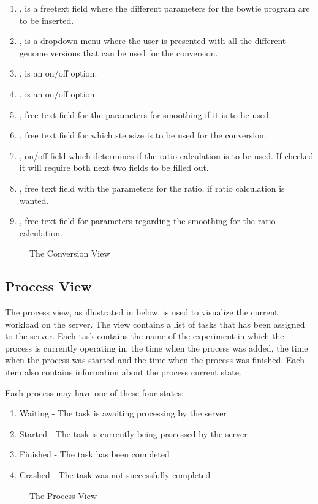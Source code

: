 \begin{enumerate}
	\item {}, is a freetext field where the different parameters for the bowtie program are to be inserted.
    \item {}, is a dropdown menu where the user is presented with all the different genome versions that can be used for the conversion.
    \item {}, is an on/off option.
    \item {}, is an on/off option. 
    \item {}, free text field for the parameters for smoothing if it is to be used.
    \item {}, free text field for which stepsize is to be used for the conversion.
    \item {}, on/off field which determines if the ratio calculation is to be used. If checked it will require both next two fields to be filled out.
    \item {}, free text field with the parameters for the ratio, if ratio calculation is wanted.
    \item {}, free text field for parameters regarding the smoothing for the ratio calculation.     

\end{enumerate}

\begin{figure}[h]
\caption{The Conversion View}
\label{fig:and_conversion_man}
\end{figure}

\FloatBarrier


\subsection{Process View}
The process view, as illustrated in  below, is used to visualize the current workload on the server. The view contains a list of tasks that has been assigned to the server. Each task contains the name of the experiment in which the process is currently operating in, the time when the process was added, the time when the process was started and the time when the process was finished. Each item also contains information about the process current state.

Each process may have one of these four states:
\begin{enumerate}
\item{Waiting} - The task is awaiting processing by the server
\item{Started} - The task is currently being processed by the server
\item{Finished} - The task has been completed
\item{Crashed} - The task was not successfully completed
\end{enumerate}

\begin{figure}[h]
\caption{ The Process View}
\label{fig:and_process_man}
\end{figure}

\FloatBarrier
